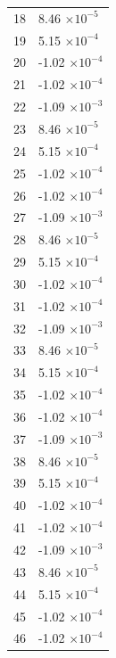 \documentclass[a4paper,11pt]{article}
\begin{document}
\begin{center}
\begin{longtable}{|R{1.5cm}|R{2.5cm}|}
   18 &         8.46 $\times 10^{          -5}$ \\
   19 &         5.15 $\times 10^{          -4}$ \\
   20 &        -1.02 $\times 10^{          -4}$ \\
   21 &        -1.02 $\times 10^{          -4}$ \\
   22 &        -1.09 $\times 10^{          -3}$ \\
   23 &         8.46 $\times 10^{          -5}$ \\
   24 &         5.15 $\times 10^{          -4}$ \\
   25 &        -1.02 $\times 10^{          -4}$ \\
   26 &        -1.02 $\times 10^{          -4}$ \\
   27 &        -1.09 $\times 10^{          -3}$ \\
   28 &         8.46 $\times 10^{          -5}$ \\
   29 &         5.15 $\times 10^{          -4}$ \\
   30 &        -1.02 $\times 10^{          -4}$ \\
   31 &        -1.02 $\times 10^{          -4}$ \\
   32 &        -1.09 $\times 10^{          -3}$ \\
   33 &         8.46 $\times 10^{          -5}$ \\
   34 &         5.15 $\times 10^{          -4}$ \\
   35 &        -1.02 $\times 10^{          -4}$ \\
   36 &        -1.02 $\times 10^{          -4}$ \\
   37 &        -1.09 $\times 10^{          -3}$ \\
   38 &         8.46 $\times 10^{          -5}$ \\
   39 &         5.15 $\times 10^{          -4}$ \\
   40 &        -1.02 $\times 10^{          -4}$ \\
   41 &        -1.02 $\times 10^{          -4}$ \\
   42 &        -1.09 $\times 10^{          -3}$ \\
   43 &         8.46 $\times 10^{          -5}$ \\
   44 &         5.15 $\times 10^{          -4}$ \\
   45 &        -1.02 $\times 10^{          -4}$ \\
   46 &        -1.02 $\times 10^{          -4}$ \\

\end{longtable}
\end{center}
\end{document}
